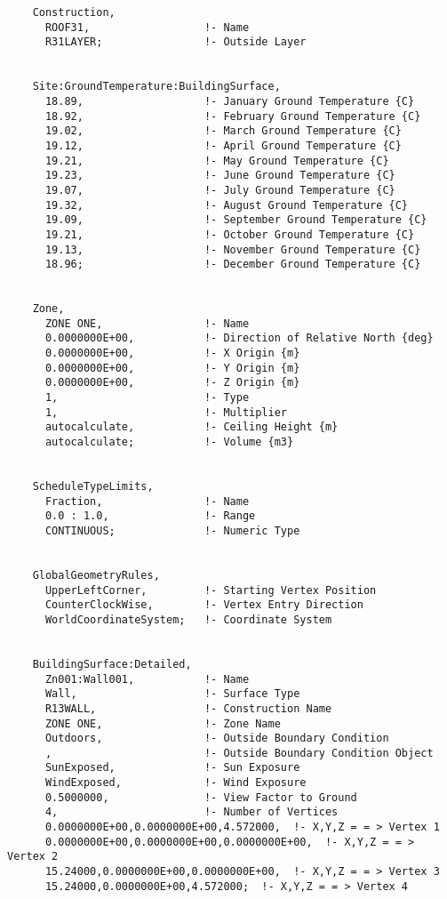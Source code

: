 \begin{lstlisting}
    Construction,
      ROOF31,                  !- Name
      R31LAYER;                !- Outside Layer


    Site:GroundTemperature:BuildingSurface,
      18.89,                   !- January Ground Temperature {C}
      18.92,                   !- February Ground Temperature {C}
      19.02,                   !- March Ground Temperature {C}
      19.12,                   !- April Ground Temperature {C}
      19.21,                   !- May Ground Temperature {C}
      19.23,                   !- June Ground Temperature {C}
      19.07,                   !- July Ground Temperature {C}
      19.32,                   !- August Ground Temperature {C}
      19.09,                   !- September Ground Temperature {C}
      19.21,                   !- October Ground Temperature {C}
      19.13,                   !- November Ground Temperature {C}
      18.96;                   !- December Ground Temperature {C}


    Zone,
      ZONE ONE,                !- Name
      0.0000000E+00,           !- Direction of Relative North {deg}
      0.0000000E+00,           !- X Origin {m}
      0.0000000E+00,           !- Y Origin {m}
      0.0000000E+00,           !- Z Origin {m}
      1,                       !- Type
      1,                       !- Multiplier
      autocalculate,           !- Ceiling Height {m}
      autocalculate;           !- Volume {m3}


    ScheduleTypeLimits,
      Fraction,                !- Name
      0.0 : 1.0,               !- Range
      CONTINUOUS;              !- Numeric Type


    GlobalGeometryRules,
      UpperLeftCorner,         !- Starting Vertex Position
      CounterClockWise,        !- Vertex Entry Direction
      WorldCoordinateSystem;   !- Coordinate System


    BuildingSurface:Detailed,
      Zn001:Wall001,           !- Name
      Wall,                    !- Surface Type
      R13WALL,                 !- Construction Name
      ZONE ONE,                !- Zone Name
      Outdoors,                !- Outside Boundary Condition
      ,                        !- Outside Boundary Condition Object
      SunExposed,              !- Sun Exposure
      WindExposed,             !- Wind Exposure
      0.5000000,               !- View Factor to Ground
      4,                       !- Number of Vertices
      0.0000000E+00,0.0000000E+00,4.572000,  !- X,Y,Z = = > Vertex 1
      0.0000000E+00,0.0000000E+00,0.0000000E+00,  !- X,Y,Z = = > Vertex 2
      15.24000,0.0000000E+00,0.0000000E+00,  !- X,Y,Z = = > Vertex 3
      15.24000,0.0000000E+00,4.572000;  !- X,Y,Z = = > Vertex 4



\end{lstlisting}
